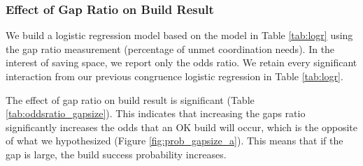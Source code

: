\subsubsection{Effect of Gap Ratio on Build Result}
\label{sec:gapsizeresult}
We build a logistic regression model based on the model in Table \ref{tab:logr} using the gap ratio measurement (percentage of unmet coordination needs). In the interest of saving space, we report only the odds ratio. We retain every significant interaction from our previous congruence logistic regression in Table \ref{tab:logr}.

The effect of gap ratio on build result is significant (Table \ref{tab:oddsratio_gapsize}). This indicates that increasing the gaps ratio significantly increases the odds that an OK build will occur, which is the opposite of what we hypothesized (Figure \ref{fig:prob_gapsize_a}). This means that if the gap is large, the build success probability increases.




